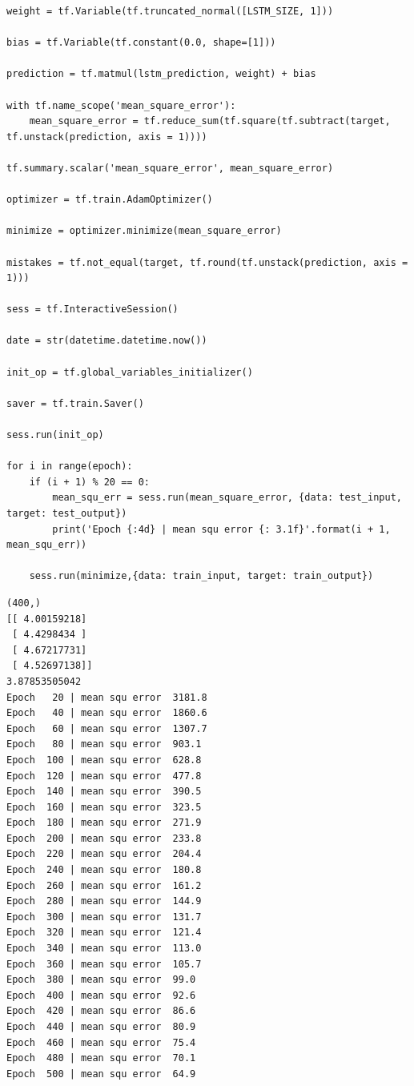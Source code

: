 \documentclass[12pt,fleqn]{article}\usepackage{../../common}
\begin{document}
\begin{verbatim}
weight = tf.Variable(tf.truncated_normal([LSTM_SIZE, 1]))

bias = tf.Variable(tf.constant(0.0, shape=[1]))

prediction = tf.matmul(lstm_prediction, weight) + bias

with tf.name_scope('mean_square_error'):
    mean_square_error = tf.reduce_sum(tf.square(tf.subtract(target, tf.unstack(prediction, axis = 1))))
    
tf.summary.scalar('mean_square_error', mean_square_error)

optimizer = tf.train.AdamOptimizer()

minimize = optimizer.minimize(mean_square_error)

mistakes = tf.not_equal(target, tf.round(tf.unstack(prediction, axis = 1)))

sess = tf.InteractiveSession()

date = str(datetime.datetime.now())

init_op = tf.global_variables_initializer()

saver = tf.train.Saver() 

sess.run(init_op)

for i in range(epoch):
    if (i + 1) % 20 == 0:
        mean_squ_err = sess.run(mean_square_error, {data: test_input, target: test_output})
        print('Epoch {:4d} | mean squ error {: 3.1f}'.format(i + 1, mean_squ_err))
    
    sess.run(minimize,{data: train_input, target: train_output})
\end{verbatim}

\begin{verbatim}
(400,)
[[ 4.00159218]
 [ 4.4298434 ]
 [ 4.67217731]
 [ 4.52697138]]
3.87853505042
Epoch   20 | mean squ error  3181.8
Epoch   40 | mean squ error  1860.6
Epoch   60 | mean squ error  1307.7
Epoch   80 | mean squ error  903.1
Epoch  100 | mean squ error  628.8
Epoch  120 | mean squ error  477.8
Epoch  140 | mean squ error  390.5
Epoch  160 | mean squ error  323.5
Epoch  180 | mean squ error  271.9
Epoch  200 | mean squ error  233.8
Epoch  220 | mean squ error  204.4
Epoch  240 | mean squ error  180.8
Epoch  260 | mean squ error  161.2
Epoch  280 | mean squ error  144.9
Epoch  300 | mean squ error  131.7
Epoch  320 | mean squ error  121.4
Epoch  340 | mean squ error  113.0
Epoch  360 | mean squ error  105.7
Epoch  380 | mean squ error  99.0
Epoch  400 | mean squ error  92.6
Epoch  420 | mean squ error  86.6
Epoch  440 | mean squ error  80.9
Epoch  460 | mean squ error  75.4
Epoch  480 | mean squ error  70.1
Epoch  500 | mean squ error  64.9
\end{verbatim}
\end{document}
